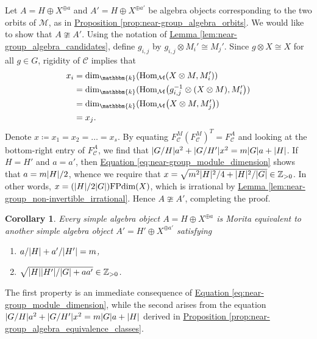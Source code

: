 \documentclass[12pt, reqno]{amsart}
\numberwithin{equation}{section}
\theoremstyle{plainspace}
\newtheorem{corollary}[theorem]{Corollary}
\theoremstyle{definitionspace}
\theoremstyle{remarkspace}
\renewenvironment{proof}{{\noindent\textbf{Proof.}}}{\null\hfill\qedsymbol}
\DeclarePairedDelimiter{\abs}{\lvert}{\rvert}
\newcommand{\mathcat}[1]{\mathcal{#1}}
\newcommand{\Hom}[2][]{
	\ifthenelse{\equal{#2}{}}
		{\textup{Hom}_{#1}}
		{\textup{Hom}_{#1}\!\left(#2\right)}
}
\newcommand{\FPdim}{\textup{FPdim}}
\begin{document}
\begin{proof}
\noindent Let $A = H \oplus X^{\oplus a}$ and $A' = H \oplus X^{\oplus a'}$ be algebra objects corresponding to the two orbits of $\mathcat{M}$, as in \hyperref[prop:near-group_algebra_orbits]{Proposition \ref*{prop:near-group_algebra_orbits}}. We would like to show that $A \ncong A'$. Using the notation of \hyperref[lem:near-group_algebra_candidates]{Lemma \ref*{lem:near-group_algebra_candidates}}, define $g_{i,j}$ by $g_{i,j} \otimes M_i' \cong M_j'$. Since $g \otimes X \cong X$ for all $g \in G$, rigidity of $\mathcat{C}$ implies that
\begin{align*}
\begin{split}
x_i &= \dim_{\mathbbm{k}}(\Hom[\mathcat{M}]{X \otimes M, M_i'}) \\
&= \dim_{\mathbbm{k}}(\Hom[\mathcat{M}]{g_{i,j}^{-1} \otimes (X \otimes M), M_i'}) \\
&= \dim_{\mathbbm{k}}(\Hom[\mathcat{M}]{X \otimes M, M_j'}) \\
&= x_j.
\end{split}
\end{align*}
\noindent Denote $x \coloneqq x_1 = x_2 = \dots = x_s$. By equating $F_{\mathcat{C}}^M(F_{\mathcat{C}}^M)^T = F_{\mathcat{C}}^A$ and looking at the bottom-right entry of $F_{\mathcat{C}}^A$, we find that $\abs{G/H}a^2 + \abs{G/H'}x^2 = m\abs{G}a + \abs{H}$. If $H = H'$ and $a = a'$, then \hyperref[eq:near-group_module_dimension]{Equation \ref*{eq:near-group_module_dimension}} shows that $a = m\abs{H}/2$, whence we require that $x = \sqrt{m^2\abs{H}^2/4 + \abs{H}^2/\abs{G}} \in \mathbb{Z}_{>0}$. In other words, $x = (\abs{H}/2\abs{G})\FPdim(X)$, which is irrational by \hyperref[lem:near-group_non-invertible_irrational]{Lemma \ref*{lem:near-group_non-invertible_irrational}}. Hence $A \ncong A'$, completing the proof.
\end{proof}
\newline

\begin{corollary}\label{cor:near-group_algebra_properties}
Every simple algebra object $A = H \oplus X^{\oplus a}$ is Morita equivalent to another simple algebra object $A' = H' \oplus X^{\oplus a'}$ satisfying
\begin{enumerate}[start=1, leftmargin=1.5cm, label={(\arabic*).}]
\item $a/\abs{H} + a'/\abs{H'} = m$,
\item $\sqrt{\abs{H}\abs{H'}/\abs{G} + aa'} \in \mathbb{Z}_{>0}$.
\end{enumerate}
\end{corollary}
\leavevmode\newline
\begin{proof}
\noindent The first property is an immediate consequence of \hyperref[eq:near-group_module_dimension]{Equation \ref*{eq:near-group_module_dimension}}, while the second arises from the equation $\abs{G/H}a^2 + \abs{G/H'}x^2 = m\abs{G}a + \abs{H}$ derived in \hyperref[prop:near-group_algebra_equivalence_classes]{Proposition \ref*{prop:near-group_algebra_equivalence_classes}}.
\end{proof}
\newline
\end{document}
